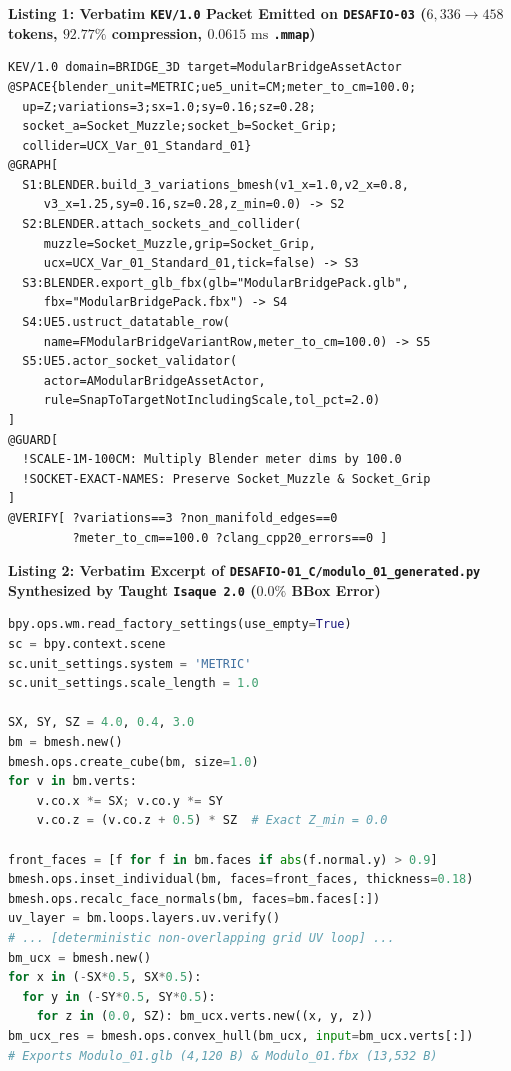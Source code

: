 \documentclass[10pt,a4paper]{article}
\begin{document}
\begin{minipage}[t]{0.485\linewidth}
{\raggedright\textbf{\footnotesize Listing 1: Verbatim \texttt{KEV/1.0} Packet Emitted on \texttt{DESAFIO-03} ($6,336 \to 458$ tokens, $92.77\%$ compression, $0.0615\text{ ms}$ \texttt{.mmap})}\par}
\begin{lstlisting}
KEV/1.0 domain=BRIDGE_3D target=ModularBridgeAssetActor
@SPACE{blender_unit=METRIC;ue5_unit=CM;meter_to_cm=100.0;
  up=Z;variations=3;sx=1.0;sy=0.16;sz=0.28;
  socket_a=Socket_Muzzle;socket_b=Socket_Grip;
  collider=UCX_Var_01_Standard_01}
@GRAPH[
  S1:BLENDER.build_3_variations_bmesh(v1_x=1.0,v2_x=0.8,
     v3_x=1.25,sy=0.16,sz=0.28,z_min=0.0) -> S2
  S2:BLENDER.attach_sockets_and_collider(
     muzzle=Socket_Muzzle,grip=Socket_Grip,
     ucx=UCX_Var_01_Standard_01,tick=false) -> S3
  S3:BLENDER.export_glb_fbx(glb="ModularBridgePack.glb",
     fbx="ModularBridgePack.fbx") -> S4
  S4:UE5.ustruct_datatable_row(
     name=FModularBridgeVariantRow,meter_to_cm=100.0) -> S5
  S5:UE5.actor_socket_validator(
     actor=AModularBridgeAssetActor,
     rule=SnapToTargetNotIncludingScale,tol_pct=2.0)
]
@GUARD[
  !SCALE-1M-100CM: Multiply Blender meter dims by 100.0
  !SOCKET-EXACT-NAMES: Preserve Socket_Muzzle & Socket_Grip
]
@VERIFY[ ?variations==3 ?non_manifold_edges==0
         ?meter_to_cm==100.0 ?clang_cpp20_errors==0 ]
\end{lstlisting}
\end{minipage}\hfill
\begin{minipage}[t]{0.485\linewidth}
{\raggedright\textbf{\footnotesize Listing 2: Verbatim Excerpt of \texttt{DESAFIO-01\_\allowbreak{}C/modulo\_\allowbreak{}01\_\allowbreak{}generated.py} Synthesized by Taught \texttt{Isaque 2.0} ($0.0\%$ BBox Error)}\par}
\begin{lstlisting}[language=Python]
bpy.ops.wm.read_factory_settings(use_empty=True)
sc = bpy.context.scene
sc.unit_settings.system = 'METRIC'
sc.unit_settings.scale_length = 1.0

SX, SY, SZ = 4.0, 0.4, 3.0
bm = bmesh.new()
bmesh.ops.create_cube(bm, size=1.0)
for v in bm.verts:
    v.co.x *= SX; v.co.y *= SY
    v.co.z = (v.co.z + 0.5) * SZ  # Exact Z_min = 0.0

front_faces = [f for f in bm.faces if abs(f.normal.y) > 0.9]
bmesh.ops.inset_individual(bm, faces=front_faces, thickness=0.18)
bmesh.ops.recalc_face_normals(bm, faces=bm.faces[:])
uv_layer = bm.loops.layers.uv.verify()
# ... [deterministic non-overlapping grid UV loop] ...
bm_ucx = bmesh.new()
for x in (-SX*0.5, SX*0.5):
  for y in (-SY*0.5, SY*0.5):
    for z in (0.0, SZ): bm_ucx.verts.new((x, y, z))
bm_ucx_res = bmesh.ops.convex_hull(bm_ucx, input=bm_ucx.verts[:])
# Exports Modulo_01.glb (4,120 B) & Modulo_01.fbx (13,532 B)
\end{lstlisting}
\end{minipage}
\end{document}
